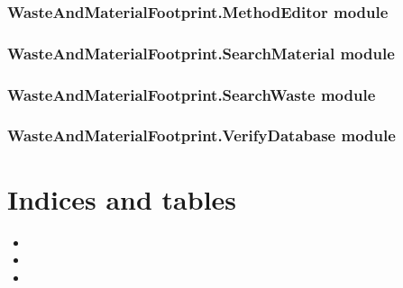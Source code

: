 \documentclass[letterpaper,10pt,english]{sphinxmanual}
\begin{document}
\subsection{WasteAndMaterialFootprint.MethodEditor module}
\label{\detokenize{WasteAndMaterialFootprint:wasteandmaterialfootprint-methodeditor-module}}

\subsection{WasteAndMaterialFootprint.SearchMaterial module}
\label{\detokenize{WasteAndMaterialFootprint:wasteandmaterialfootprint-searchmaterial-module}}

\subsection{WasteAndMaterialFootprint.SearchWaste module}
\label{\detokenize{WasteAndMaterialFootprint:wasteandmaterialfootprint-searchwaste-module}}

\subsection{WasteAndMaterialFootprint.VerifyDatabase module}
\label{\detokenize{WasteAndMaterialFootprint:wasteandmaterialfootprint-verifydatabase-module}}

\chapter{Indices and tables}
\label{\detokenize{index:indices-and-tables}}\begin{itemize}
\item {} 
\sphinxAtStartPar
{}

\item {} 
\sphinxAtStartPar
{}

\item {} 
\sphinxAtStartPar
{}

\end{itemize}



\renewcommand{\indexname}{Index}
\printindex
\end{document}
